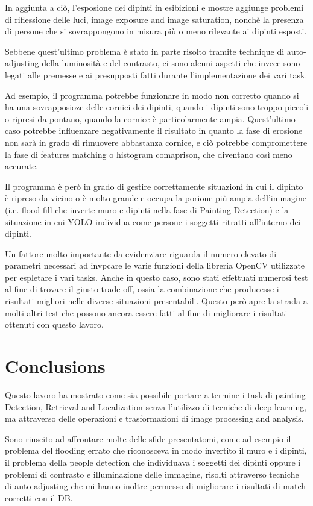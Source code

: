 \documentclass[10pt,twocolumn,letterpaper]{article}
\begin{document}
In aggiunta a ciò, l'esposione dei dipinti in esibizioni e mostre aggiunge problemi di riflessione delle luci, image exposure and image saturation, nonchè la presenza di persone che si sovrappongono in misura più o meno rilevante ai dipinti esposti.

Sebbene quest'ultimo problema è stato in parte risolto tramite technique di auto-adjusting della luminosità e del contrasto, ci sono alcuni aspetti che invece sono legati alle premesse e ai presupposti fatti durante l'implementazione dei vari task.

Ad esempio, il programma potrebbe funzionare in modo non corretto quando si ha una sovrapposioze delle cornici dei dipinti, quando i dipinti sono troppo piccoli o ripresi da pontano, quando la cornice è particolarmente ampia. Quest'ultimo caso potrebbe influenzare negativamente il risultato in quanto la fase di erosione non sarà in grado di rimuovere abbastanza cornice, e ciò potrebbe compromettere la fase di features matching o histogram comaprison, che diventano così meno accurate.

Il programma è però in grado di gestire correttamente situazioni in cui il dipinto è ripreso da vicino o è molto grande e occupa la porione più ampia dell'immagine (i.e. flood fill che inverte muro e dipinti nella fase di Painting Detection) e la situazione in cui YOLO individua come persone i soggetti ritratti all'interno dei dipinti.

Un fattore molto importante da evidenziare riguarda il numero elevato di parametri necessari ad invpcare le varie funzioni della libreria OpenCV utilizzate per espletare i vari tasks. Anche in questo caso, sono stati effettuati numerosi test al fine di trovare il giusto trade-off, ossia la combinazione che producesse i risultati migliori nelle diverse situazioni presentabili.
Questo però apre la strada a molti altri test che possono ancora essere fatti al fine di migliorare i risultati ottenuti con questo lavoro.

\section{Conclusions}
Questo lavoro ha mostrato come sia possibile portare a termine i task di painting Detection, Retrieval and Localization senza l'utilizzo di tecniche di deep learning, ma attraverso delle operazioni e trasformazioni di image processing and analysis. 

Sono riuscito ad affrontare molte delle sfide presentatomi, come ad esempio il problema del flooding errato che riconosceva in modo invertito il muro e i dipinti, il problema della people detection che individuava i soggetti dei dipinti oppure i problemi di contrasto e illuminazione delle immagine, risolti attraverso tecniche di auto-adjusting che mi hanno inoltre permesso di migliorare i risultati di match corretti con il DB.
\end{document}
